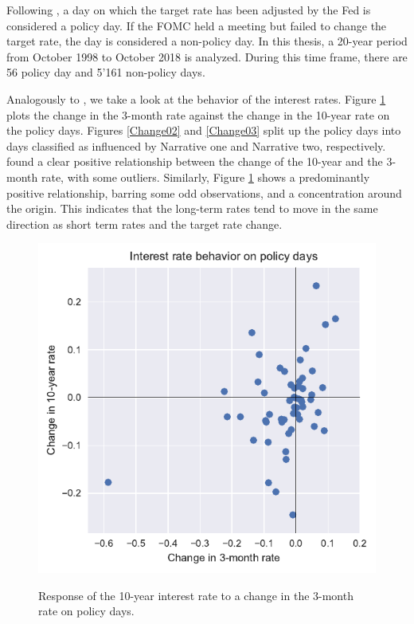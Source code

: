 \documentclass[11pt,a4paper,english,oneside]{book}
\numberwithin{equation}{chapter}
\begin{document}
Following \cite{Ellingsen.2003}, a day on which the target rate has been adjusted by the Fed is considered a policy day. If the FOMC held a meeting but failed to change the target rate, the day is considered a non-policy day. In this thesis, a 20-year period from October 1998 to October 2018 is analyzed. During this time frame, there are 56 policy day and 5'161 non-policy days. 

Analogously to \citet[p. 14 -- 15]{Ellingsen.2003}, we take a look at the behavior of the interest rates. Figure \ref{Change01} plots the change in the 3-month rate against the change in the 10-year rate on the policy days. Figures \ref{Change02} and \ref{Change03} split up the policy days into days classified as influenced by Narrative one and Narrative two, respectively. \citet[p. 14]{Ellingsen.2003} found a clear positive relationship between the change of the 10-year and the 3-month rate, with some outliers. Similarly, Figure \ref{Change01} shows a predominantly positive relationship, barring some odd observations, and a concentration around the origin. This indicates that the long-term rates tend to move in the same direction as short term rates and the target rate change. 

\begin{figure}
	\caption{Response of the 10-year interest rate to a change in the 3-month rate on policy days.}
	\centering
	\includegraphics[scale=1]{Images/ChangePlot01.pdf}
	\label{Change01}
\end{figure}
\end{document}
